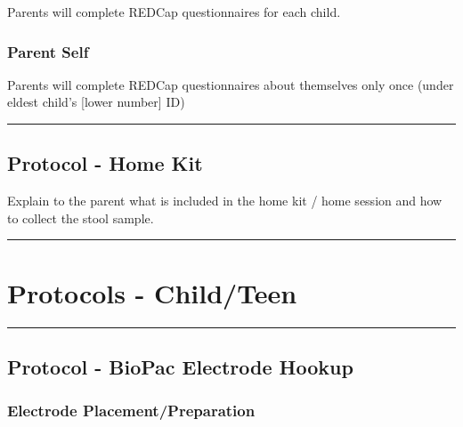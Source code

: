 \documentclass[]{book}
\begin{document}
Parents will complete REDCap questionnaires for each child.

\hypertarget{parent-self-1}{%
\subsubsection{Parent Self}\label{parent-self-1}}

Parents will complete REDCap questionnaires about themselves only once (under eldest child's {[}lower number{]} ID)

\begin{center}\rule{0.5\linewidth}{0.5pt}\end{center}

\hypertarget{protocol---home-kit}{%
\subsection{Protocol - Home Kit}\label{protocol---home-kit}}

Explain to the parent what is included in the home kit / home session and how to collect the stool sample.

\begin{center}\rule{0.5\linewidth}{0.5pt}\end{center}

\hypertarget{protocols---childteen}{%
\section{Protocols - Child/Teen}\label{protocols---childteen}}

\begin{center}\rule{0.5\linewidth}{0.5pt}\end{center}

\hypertarget{protocol---biopac-electrode-hookup}{%
\subsection{Protocol - BioPac Electrode Hookup}\label{protocol---biopac-electrode-hookup}}

\hypertarget{electrode-placementpreparation}{%
\subsubsection{Electrode Placement/Preparation}\label{electrode-placementpreparation}}
\end{document}
